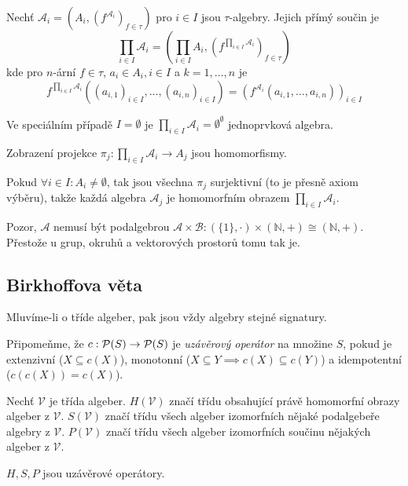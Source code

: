 \begin{definition}
    Nechť $\mathcal{A}_i = (A_i, (f^{\mathcal{A}_i})_{f \in \tau})$ pro
    $i \in I$ jsou $\tau$-algebry. Jejich přímý součin je
    \[
        \prod_{i \in I} \mathcal{A}_i = (\prod_{i \in I} A_i,
        (f^{\prod_{i \in I} \mathcal{A}_i})_{f \in \tau})
    \]
    kde pro $n$-ární $f \in \tau$, $a_i \in A_i, i \in I$
    a $k = 1,\ldots,n$ je
    \[
    f^{\prod_{i \in I} \mathcal{A}_i}
    ((a_{i,1})_{i \in I}, \ldots, (a_{i,n})_{i \in I})
    = (f^{\mathcal{A}_i}(a_{i,1}, \ldots, a_{i,n}))_{i \in I}
    \]
\end{definition}

Ve speciálním případě $I = \emptyset$ je
$\prod_{i \in I} \mathcal{A}_i = \emptyset^\emptyset$ jednoprvková
algebra.

Zobrazení projekce
$\pi_j : \prod_{i \in I} \mathcal{A}_i \to A_j$ jsou homomorfismy.

Pokud $\forall i \in I : A_i \neq \emptyset$, tak jsou všechna $\pi_j$
surjektivní (to je přesně axiom výběru), takže každá algebra
$\mathcal{A}_j$ je homomorfním obrazem
$\prod_{i \in I} \mathcal{A}_i$.

Pozor, $\mathcal{A}$ nemusí být podalgebrou
$\mathcal{A} \times \mathcal{B} :
(\{1\}, \cdot) \times (\mathbb{N}, {+}) \cong (\mathbb{N}, {+})$.
Přestože u grup, okruhů a vektorových prostorů tomu tak je.

\subsection{Birkhoffova věta}

Mluvíme-li o tříde algeber, pak jsou vždy algebry stejné signatury.

Připomeňme, že $c : \mathcal{P}(S) \to \mathcal{P}(S)$
je {\em uzávěrový operátor} na množine $S$,
pokud je extenzivní ($X \subseteq c(X)$), monotonní
($X \subseteq Y \implies c(X) \subseteq c(Y)$)
a idempotentní ($c(c(X)) = c(X)$).

\begin{definition}[H, S, P]
    Nechť $\mathcal{V}$ je třída algeber.
    $H(\mathcal{V})$ značí třídu obsahující právě homomorfní obrazy
    algeber z $\mathcal{V}$.
    $S(\mathcal{V})$ značí třídu všech algeber izomorfních nějaké podalgebeře
    algebry z $\mathcal{V}$.
    $P(\mathcal{V})$ značí třídu všech algeber izomorfních součinu
    nějakých algeber z $\mathcal{V}$.
\end{definition}

\begin{claim}
$H,S,P$ jsou uzávěrové operátory.
\end{claim}

